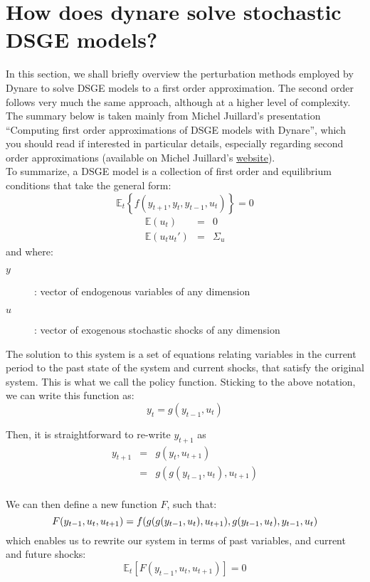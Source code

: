 \section{How does dynare solve stochastic DSGE models?}
In this section, we shall briefly overview the perturbation methods employed by Dynare to solve DSGE models to a first order approximation. The second order follows very much the same approach, although at a higher level of complexity. The summary below is taken mainly from Michel Juillard's presentation ``Computing first order approximations of DSGE models with Dynare'', which you should read if interested in particular details, especially regarding second order approximations (available on Michel Juillard's \href{http://jourdan.ens.fr/~michel/}{website}). \\

To summarize, a DSGE model is a collection of first order and equilibrium conditions that take the general form: 
\[
\mathbb{E}_t\left\{f(y_{t+1},y_t,y_{t-1},u_t)\right\}=0
\]
\begin{eqnarray*}
\mathbb{E}(u_t) &=& 0\\
\mathbb{E}(u_t u_t') &=& \Sigma_u
\end{eqnarray*}
and where:
\begin{description}
  \item[$y$]: vector of endogenous variables of any dimension
  \item[$u$]: vector of exogenous stochastic shocks of any dimension
\end{description}

The solution to this system is a set of equations relating variables in the current period to the past state of the system and current shocks, that satisfy the original system. This is what we call the policy function. Sticking to the above notation, we can write this function as:
\[
y_t = g(y_{t-1},u_t)
\]

Then, it is straightforward to re-write $y_{t+1}$ as
\begin{eqnarray*}
  y_{t+1} &=& g(y_t,u_{t+1})\\
  &=& g(g(y_{t-1},u_t),u_{t+1})\\
\end{eqnarray*}

We can then define a new function $F$, such that:
\[
F(y_{t-1},u_t,u_{t+1}) =
f(g(g(y_{t-1},u_t),u_{t+1}),g(y_{t-1},u_t),y_{t-1},u_t)\\
\]
which enables us to rewrite our system in terms of past variables, and current and future shocks:
\[
\mathbb{E}_t\left[F(y_{t-1},u_t,u_{t+1})\right] = 0
\]

